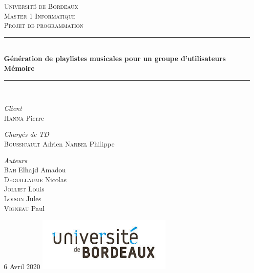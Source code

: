 \documentclass{article}
\begin{document}
\begin{titlepage}
	\newcommand{\HRule}{\rule{\linewidth}{0.5mm}}
					
	\center
					
	\textsc{\LARGE Université de Bordeaux}\\[1.5cm]
					
	\textsc{\Large Master 1 Informatique}\\[0.5cm]
					
	\textsc{\large Projet de programmation}\\[0.5cm]
					
	\HRule\\[0.4cm]
					
	{\huge\bfseries Génération de playlistes musicales pour un groupe d'utilisateurs}\\[0.4cm]
	{\Large\bfseries Mémoire}
	\HRule\\[1.5cm]
					
	\begin{minipage}{0.4\textwidth}
			
		\begin{flushleft}
			\large
			\textit{Client}\\
			\textsc{Hanna}  Pierre 
		\end{flushleft}
				
		\begin{flushleft}
			\large
			\textit{Chargés de TD}\\
			\textsc{Boussicault}  Adrien 
			\textsc{Narbel}  Philippe 
		\end{flushleft}
				
		\begin{flushleft}
			\large
			\textit{Auteurs}\\
			\textsc{Bah} Elhajd Amadou
			\\
			\textsc{Deguillaume} Nicolas
			\\
			\textsc{Jolliet} Louis
			\\
			\textsc{Loison} Jules 
			\\
			\textsc{Vigneau} Paul 
		\end{flushleft}
				
	\end{minipage}
	\vfill\vfill\vfill
					
	{\large 6 Avril 2020}
	\vfill\vfill
	\includegraphics[width=0.5\textwidth]{ressources/Logo.jpg}\\[1cm]
		\vfill
		\end{titlepage}
		\justify
		\renewcommand{\contentsname}{Table des matières}
		\tableofcontents
		\newpage
								
\end{document}
